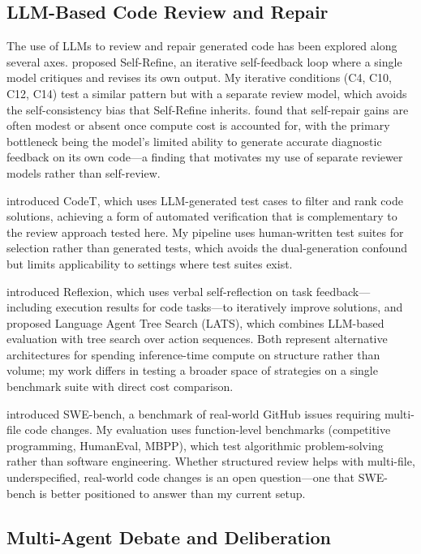 \documentclass{article}
\begin{document}
\subsection{LLM-Based Code Review and Repair}

The use of LLMs to review and repair generated code has been explored along several axes. \citet{madaan2023selfrefine} proposed Self-Refine, an iterative self-feedback loop where a single model critiques and revises its own output. My iterative conditions (C4, C10, C12, C14) test a similar pattern but with a separate review model, which avoids the self-consistency bias that Self-Refine inherits. \citet{olausson2024selfrepair} found that self-repair gains are often modest or absent once compute cost is accounted for, with the primary bottleneck being the model's limited ability to generate accurate diagnostic feedback on its own code---a finding that motivates my use of separate reviewer models rather than self-review.

\citet{chen2023codet} introduced CodeT, which uses LLM-generated test cases to filter and rank code solutions, achieving a form of automated verification that is complementary to the review approach tested here. My pipeline uses human-written test suites for selection rather than generated tests, which avoids the dual-generation confound but limits applicability to settings where test suites exist.

\citet{shinn2023reflexion} introduced Reflexion, which uses verbal self-reflection on task feedback---including execution results for code tasks---to iteratively improve solutions, and \citet{zhou2024lats} proposed Language Agent Tree Search (LATS), which combines LLM-based evaluation with tree search over action sequences. Both represent alternative architectures for spending inference-time compute on structure rather than volume; my work differs in testing a broader space of strategies on a single benchmark suite with direct cost comparison.

\citet{jimenez2024swebench} introduced SWE-bench, a benchmark of real-world GitHub issues requiring multi-file code changes. My evaluation uses function-level benchmarks (competitive programming, HumanEval, MBPP), which test algorithmic problem-solving rather than software engineering. Whether structured review helps with multi-file, underspecified, real-world code changes is an open question---one that SWE-bench is better positioned to answer than my current setup.

\subsection{Multi-Agent Debate and Deliberation}
\end{document}
